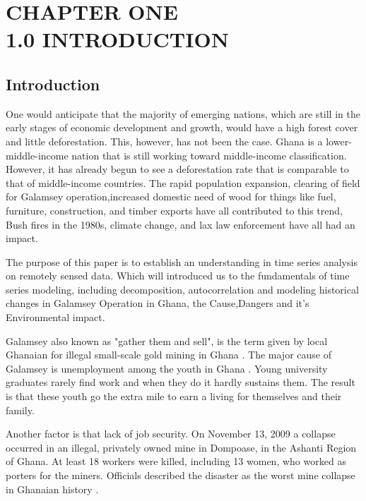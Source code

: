 
\chapter{CHAPTER ONE\\1.0 INTRODUCTION} %
\section{Introduction}
\label{Chapter1} %


One would anticipate that the majority of emerging nations, which are still in the early stages of economic development and growth, would have a high forest cover and little deforestation. This, however, has not been the case. Ghana is a lower-middle-income nation that is still working toward middle-income classification. However, it has already begun to see a deforestation rate that is comparable to that of middle-income countries. The rapid population expansion, clearing of field for Galamsey operation,increased domestic need of wood for things like fuel, furniture, construction, and timber exports have all contributed to this trend, Bush fires in the 1980s, climate change, and lax law enforcement have all had an impact.

The purpose of this paper is to establish an understanding in time series analysis on remotely sensed data. Which will introduced us to the fundamentals of time series modeling, including decomposition, autocorrelation and modeling historical changes in Galamsey Operation in Ghana, the Cause,Dangers and it's Environmental impact.

Galamsey also known as "gather them and sell",\parencite{Owusu-Nimo2018} is the term given by local Ghanaian for illegal small-scale gold mining in Ghana . The major cause of Galamsey is unemployment among the youth in Ghana \parencite{Gracia2018}. Young university graduates rarely find work and when they do it hardly sustains them. The result is that these youth go the extra mile to earn a living for themselves and their family.

Another factor is that lack of job security. On November 13, 2009 a collapse occurred in an illegal, privately owned mine in Dompoase, in the Ashanti Region of Ghana. At least 18 workers were killed, including 13 women, who worked as porters for the miners. Officials described the disaster as the worst mine collapse in Ghanaian history \parencite{womendi2009}.

